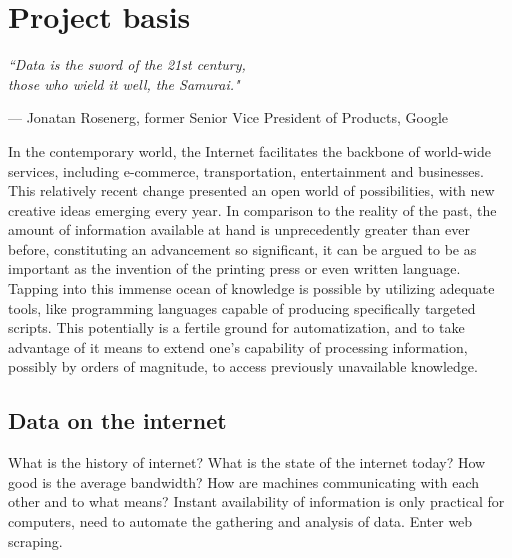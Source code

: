 \chapter{Project basis}
\label{ch:basis}
\setlength{\epigraphwidth}{8.8cm}
\epigraph{\textit{``Data is the sword of the 21st century, \\\hspace{2.4cm}those who wield it well, the Samurai."}}{--- Jonatan Rosenerg, former Senior Vice President of Products, Google}

In the contemporary world, the Internet facilitates the backbone of world-wide services, including e-commerce, transportation, entertainment and businesses. This relatively recent change presented an open world of possibilities, with new creative ideas emerging every year. In comparison to the reality of the past, the amount of information available at hand is unprecedently greater than ever before, constituting an advancement so significant, it can be argued to be as important as the invention of the printing press or even written language. Tapping into this immense ocean of knowledge is possible by utilizing adequate tools, like programming languages capable of producing specifically targeted scripts. This potentially is a fertile ground for automatization, and to take advantage of it means to extend one's capability of processing information, possibly by orders of magnitude, to access previously unavailable knowledge.


\section{Data on the internet}
What is the history of internet?
What is the state of the internet today?
How good is the average bandwidth?
How are machines communicating with each other and to what means?
Instant availability of information is only practical for computers, need to automate the gathering and analysis of data. Enter web scraping.


